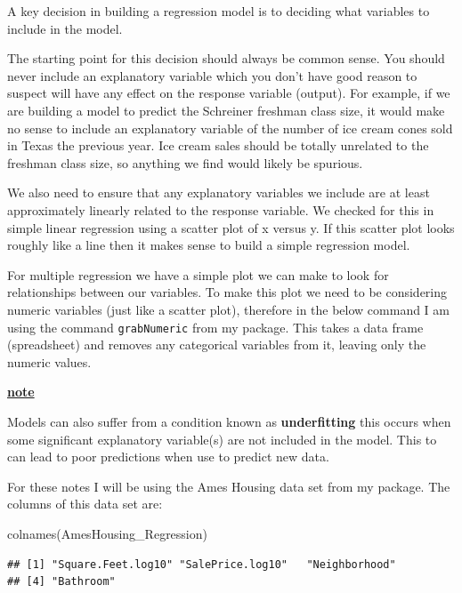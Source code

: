 \documentclass[
]{book}
\newenvironment{Shaded}{\begin{snugshade}}{\end{snugshade}}
\newcommand{\FunctionTok}[1]{\textcolor[rgb]{0.00,0.00,0.00}{#1}}
\newcommand{\NormalTok}[1]{#1}
\newenvironment{rmdblock}[1]
  {\begin{shaded*}
  \centerline{\underline{\textbf{#1}}}

  }
  {
  \end{shaded*}
  }
\newenvironment{note}
  {\begin{rmdblock}{note}}
  {\end{rmdblock}}
\theoremstyle{definition}
\theoremstyle{definition}
\theoremstyle{definition}
\theoremstyle{definition}
\theoremstyle{remark}
\begin{document}
A key decision in building a regression model is to deciding what variables to include in the model.

The starting point for this decision should always be common sense. You should never include an explanatory variable which you don't have good reason to suspect will have any effect on the response variable (output). For example, if we are building a model to predict the Schreiner freshman class size, it would make no sense to include an explanatory variable of the number of ice cream cones sold in Texas the previous year. Ice cream sales should be totally unrelated to the freshman class size, so anything we find would likely be spurious.

We also need to ensure that any explanatory variables we include are at least approximately linearly related to the response variable. We checked for this in simple linear regression using a scatter plot of x versus y. If this scatter plot looks roughly like a line then it makes sense to build a simple regression model.

For multiple regression we have a simple plot we can make to look for relationships between our variables. To make this plot we need to be considering numeric variables (just like a scatter plot), therefore in the below command I am using the command \texttt{grabNumeric} from my package. This takes a data frame (spreadsheet) and removes any categorical variables from it, leaving only the numeric values.

\begin{note}
Models can also suffer from a condition known as \textbf{underfitting} this occurs when some significant explanatory variable(s) are not included in the model. This to can lead to poor predictions when use to predict new data.
\end{note}

For these notes I will be using the Ames Housing data set from my package. The columns of this data set are:

\begin{Shaded}
\begin{Highlighting}[]
\FunctionTok{colnames}\NormalTok{(AmesHousing\_Regression)}
\end{Highlighting}
\end{Shaded}

\begin{verbatim}
## [1] "Square.Feet.log10" "SalePrice.log10"   "Neighborhood"     
## [4] "Bathroom"
\end{verbatim}
\end{document}
